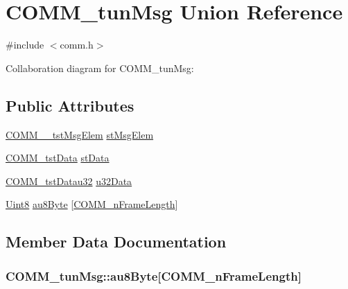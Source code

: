 \hypertarget{union_c_o_m_m__tun_msg}{}\section{C\+O\+M\+M\+\_\+tun\+Msg Union Reference}
\label{union_c_o_m_m__tun_msg}


{\ttfamily \#include $<$comm.\+h$>$}



Collaboration diagram for C\+O\+M\+M\+\_\+tun\+Msg\+:
\subsection*{Public Attributes}
\begin{DoxyCompactItemize}
\item 
\hyperlink{struct_c_o_m_m____tst_msg_elem}{C\+O\+M\+M\+\_\+\+\_\+tst\+Msg\+Elem} \hyperlink{union_c_o_m_m__tun_msg_a821f70b6f4a12cf465c9cc55a9dcd5c7}{st\+Msg\+Elem}
\item 
\hyperlink{struct_c_o_m_m__tst_data}{C\+O\+M\+M\+\_\+tst\+Data} \hyperlink{union_c_o_m_m__tun_msg_a6ec6ef686a3615469f06d6b3ae131669}{st\+Data}
\item 
\hyperlink{struct_c_o_m_m__tst_datau32}{C\+O\+M\+M\+\_\+tst\+Datau32} \hyperlink{union_c_o_m_m__tun_msg_af5dd90de47a4a2f46a8936275d6ca8e5}{u32\+Data}
\item 
\hyperlink{_d_s_p2833x___device_8h_af84840501dec18061d18a68c162a8fa2}{Uint8} \hyperlink{union_c_o_m_m__tun_msg_a8b777b61a84ef4837a2e37a50ce13f8a}{au8\+Byte} \mbox{[}\hyperlink{comm_8h_a63143291bd346d66e00d8d8fa827d4ec}{C\+O\+M\+M\+\_\+n\+Frame\+Length}\mbox{]}
\end{DoxyCompactItemize}


\subsection{Member Data Documentation}
\hypertarget{union_c_o_m_m__tun_msg_a8b777b61a84ef4837a2e37a50ce13f8a}{}
\subsubsection[{au8\+Byte}]{ C\+O\+M\+M\+\_\+tun\+Msg\+::au8\+Byte\mbox{[}{\bf C\+O\+M\+M\+\_\+n\+Frame\+Length}\mbox{]}}\label{union_c_o_m_m__tun_msg_a8b777b61a84ef4837a2e37a50ce13f8a}
\hypertarget{union_c_o_m_m__tun_msg_a6ec6ef686a3615469f06d6b3ae131669}{}
